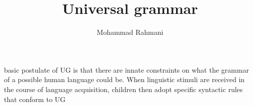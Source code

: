 \documentclass[a4paper]{article}
\title{Universal grammar}
\date{}
\author{Mohammad Rahmani}
\begin{document}
    \maketitleThe
    basic postulate of UG is that there are innate constraints on what the grammar of a possible human language could be. When linguistic stimuli are received in the course of language acquisition, children then adopt specific syntactic rules that conform to UG
    
    
\end{document}
